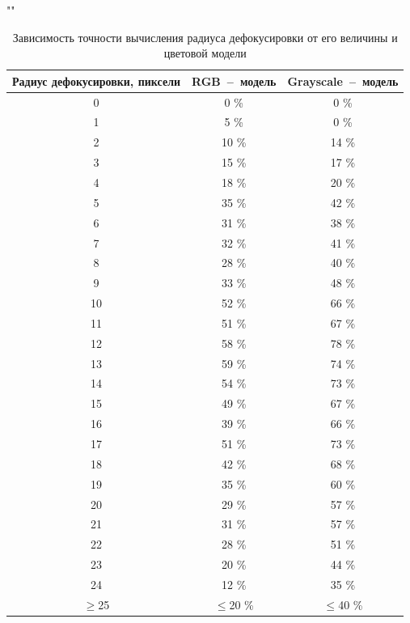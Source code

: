 \renewcommand{\arraystretch}{1.3}
\begin{table}[h!]
	\begin{center}
		\caption{Зависимость точности вычисления радиуса дефокусировки от его величины и цветовой модели}
		""\newline
		\label{tabl}
		\begin{tabular}{ |c|c|c| } 
			\hline
			\textbf{Радиус дефокусировки}, пиксели & \textbf{RGB}~--~модель & \textbf{Grayscale}~--~модель\\
			\hline
			0 & 0 \% & 0 \%\\
			\hline
			1 & 5 \%& 0 \%\\
			\hline
			2 & 10 \%& 14 \%\\
			\hline
			3 & 15 \%& 17 \%\\
			\hline
			4 & 18 \%& 20 \%\\
			\hline
			5 & 35 \%& 42 \%\\
			\hline
			6 & 31 \%& 38 \%\\
			\hline
			7 & 32 \%& 41 \%\\
			\hline
			8 & 28 \%& 40 \%\\
			\hline
			9 & 33 \%& 48 \%\\
			\hline
			10 & 52 \%& 66 \%\\
			\hline
			11 & 51 \%& 67 \%\\
			\hline
			12 & 58 \%& 78 \%\\
			\hline
			13 & 59 \%& 74 \%\\
			\hline
			14 & 54 \%& 73 \%\\
			\hline
			15 & 49 \%& 67 \%\\
			\hline
			16 & 39 \%& 66 \%\\
			\hline
			17 & 51 \%& 73 \%\\
			\hline
			18 & 42 \%& 68 \%\\
			\hline
			19 & 35 \%& 60 \%\\
			\hline
			20 & 29 \%& 57 \%\\
			\hline
			21 & 31 \%& 57 \%\\
			\hline
			22 & 28 \%& 51 \%\\
			\hline
			23 & 20 \%& 44 \%\\
			\hline
			24 & 12 \%& 35 \%\\
			\hline
			$\geq$25 & $\leq$20 \%& $\leq$40 \%\\
			\hline
		\end{tabular}
	\end{center}
\end{table}


